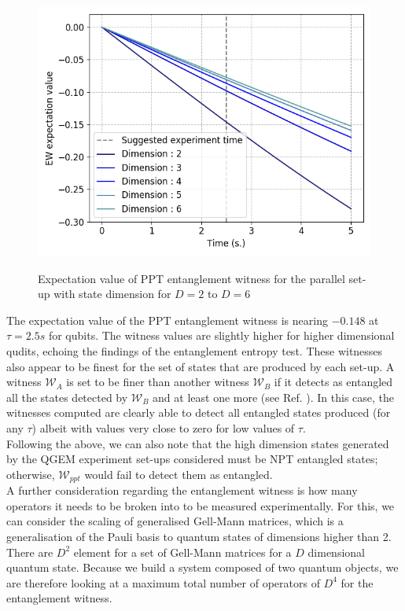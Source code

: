 \documentclass[%
 reprint,
 superscriptaddress,
 amsmath,
 amssymb,
 aps,
 longbibliography
]{revtex4-2}
\begin{document}
	\begin{figure}
        \includegraphics[width=1.\columnwidth]{EW_para_qudits.png}\par\medskip
		\caption{Expectation value of PPT entanglement witness for the parallel set-up with state dimension for $D=2$ to $D=6$}\par\medskip \label{fig:pptEW_qudit_para}
	\end{figure}
\indent The expectation value of the PPT entanglement witness is nearing $-0.148$ at $\tau=2.5s$ for qubits. The witness values are slightly higher for higher dimensional qudits, echoing the findings of the entanglement entropy test. These witnesses also appear to be finest for the set of states that are produced by each set-up. A witness $\mathcal{W}_A$ is set to be finer than another witness $\mathcal{W}_B$ if it detects as entangled all the states detected by $\mathcal{W}_B$ and at least one more (see Ref. \cite{Lewenstein2000}). In this case, the witnesses computed are clearly able to detect all entangled states produced (for any $\tau$) albeit with values very close to zero for low values of $\tau$. \\
\indent Following the above, we can also note that the high dimension states generated by the QGEM experiment set-ups considered must be NPT entangled states; otherwise, $\mathcal{W}_{ppt}$ would fail to detect them as entangled. \\
\indent A further consideration regarding the entanglement witness is how many operators it needs to be broken into to be measured experimentally. For this, we can consider the scaling of generalised Gell-Mann matrices, which is a generalisation of the Pauli basis to quantum states of dimensions higher than 2. There are $D^2$ element for a set of Gell-Mann matrices for a $D$ dimensional quantum state. Because we build a system composed of two quantum objects, we are therefore looking at a maximum total number of operators of $D^4$ for the entanglement witness. \\
\end{document}

